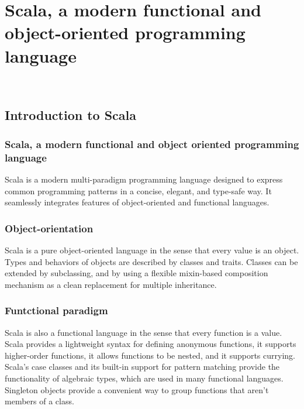 
\chapter{Scala, a modern functional and object-oriented programming language}
\label{cap:scala-language}

\\

\section{Introduction to Scala}
\subsection{Scala, a modern functional and object oriented programming language}
Scala is a modern multi-paradigm programming language designed to express common programming patterns in a concise, elegant, and type-safe way.
It seamlessly integrates features of object-oriented and functional languages.

\subsection{Object-orientation}
Scala is a pure object-oriented language in the sense that every value is an object. Types and behaviors of objects are described by classes and traits.
Classes can be extended by subclassing, and by using a flexible \gls{mixin-based composition} mechanism as a clean replacement for multiple inheritance.

\subsection{Funtctional paradigm}
Scala is also a functional language in the sense that every function is a value.
Scala provides a lightweight syntax for defining anonymous functions, it supports higher-order functions, it allows functions to be nested, and it supports currying.
Scala's case classes and its built-in support for pattern matching provide the functionality of algebraic types, which are used in many functional languages.
Singleton objects provide a convenient way to group functions that aren't members of a class.

